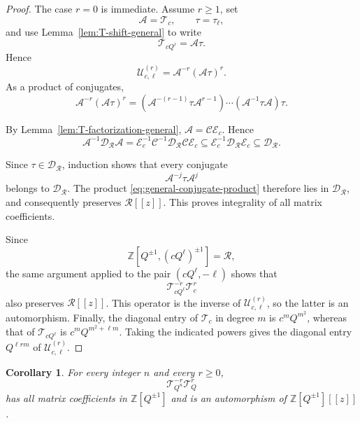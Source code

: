 \documentclass[11pt]{amsart}
\newtheorem{corollary}[theorem]{Corollary}
\newcommand{\Z}{\mathbb Z}
\begin{document}
\begin{proof}
The case \(r=0\) is immediate.  Assume \(r\geq1\), set
\[
\mathcal A=\mathcal T_c,
\qquad
\tau=\tau_\ell,
\]
and use Lemma~\ref{lem:T-shift-general} to write
\[
\mathcal T_{cQ^\ell}=\mathcal A\tau.
\]
Hence
\begin{equation}\label{eq:general-transition-factorization}
\mathcal U_{c,\ell}^{(r)}
=
\mathcal A^{-r}(\mathcal A\tau)^r.
\end{equation}
As a product of conjugates,
\begin{equation}\label{eq:general-conjugate-product}
\mathcal A^{-r}(\mathcal A\tau)^r
=
\left(\mathcal A^{-(r-1)}\tau\mathcal A^{r-1}\right)
\cdots
\left(\mathcal A^{-1}\tau\mathcal A\right)\tau.
\end{equation}

By Lemma~\ref{lem:T-factorization-general},
\(\mathcal A=\mathcal C\mathcal E_c\).  Hence
\[
\mathcal A^{-1}\mathscr D_{\mathscr R}\mathcal A
=
\mathcal E_c^{-1}
\mathcal C^{-1}\mathscr D_{\mathscr R}\mathcal C
\mathcal E_c
\subseteq
\mathcal E_c^{-1}\mathscr D_{\mathscr R}\mathcal E_c
\subseteq
\mathscr D_{\mathscr R}.
\]


Since \(\tau\in\mathscr D_{\mathscr R}\), induction shows that every
conjugate
\[
\mathcal A^{-j}\tau\mathcal A^j
\]
belongs to \(\mathscr D_{\mathscr R}\).  The product
\eqref{eq:general-conjugate-product} therefore lies in
\(\mathscr D_{\mathscr R}\), and consequently preserves
\(\mathscr R[[z]]\).  This proves integrality of all matrix
coefficients.

Since
\[
\Z[Q^{\pm1},(cQ^\ell)^{\pm1}]=\mathscr R,
\]
the same argument applied to the pair \((cQ^\ell,-\ell)\) shows that
\[
\mathcal T_{cQ^\ell}^{-r}\mathcal T_c^r
\]
also preserves \(\mathscr R[[z]]\).  This operator is the inverse of
\(\mathcal U_{c,\ell}^{(r)}\), so the latter is an automorphism.
Finally, the diagonal entry of \(\mathcal T_c\) in degree \(m\) is
\(c^mQ^{m^2}\), whereas that of \(\mathcal T_{cQ^\ell}\) is
\(c^mQ^{m^2+\ell m}\).  Taking the indicated powers gives the diagonal
entry \(Q^{\ell rm}\) of \(\mathcal U_{c,\ell}^{(r)}\).
\end{proof}

\begin{corollary}\label{cor:integral-transition}
For every integer \(n\) and every \(r\geq0\),
\begin{equation}\label{eq:integral-transition}
\mathcal T_{Q^n}^{-r}\mathcal T_Q^r
\end{equation}
has all matrix coefficients in \(\Z[Q^{\pm1}]\) and is an automorphism
of \(\Z[Q^{\pm1}][[z]]\).
\end{corollary}
\end{document}
